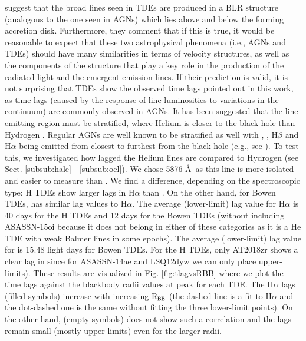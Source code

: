 \documentclass[structabstract]{aa}
\begin{document}
\citet{Guillochon2014} suggest that the broad lines seen in TDEs are produced in a BLR structure (analogous to the one seen in AGNs) which lies above and below the forming accretion disk. Furthermore, they comment that if this is true, it would be reasonable to expect that these two astrophysical phenomena (i.e., AGNs and TDEs) should have many similarities in terms of velocity structures, as well as the components of the structure that play a key role in the production of the radiated light and the emergent emission lines. If their prediction is valid, it is not surprising that TDEs show the observed time lags pointed out in this work, as time lags (caused by the response of line luminosities to variations in the continuum) are commonly observed in AGNs. 
It has been  suggested that the line emitting region must be stratified, where Helium is closer to the black hole than Hydrogen \citep{Guillochon2014,Roth2016}. Regular AGNs are well known to be stratified as well with , , H$\beta$ and H$\alpha$ being emitted from closest to furthest from the black hole (e.g., see \citealt{Clavel1991,Peterson1999}). 
To test this, we investigated how lagged the Helium lines are compared to Hydrogen (see Sect. \ref{subsub:hale} - \ref{subsub:oel}).
We chose  5876 \AA\, 
as this line is more isolated and easier to measure than . We find a difference, depending on the spectroscopic type: H TDEs show larger lags in H$\alpha$ than . On the other hand, for  Bowen TDEs,   has similar lag values to H$\alpha$. 
The average (lower-limit) lag value for H$\alpha$ is 40 days for the H TDEs and 12 days for the  Bowen TDEs (without including ASASSN-15oi because it does not belong in either of these categories as it is a He TDE with weak Balmer lines in some epochs). The average (lower-limit) lag value for  is 15.48 light days for  Bowen TDEs.
For the H TDEs, only AT2018zr shows a clear lag in   since for ASASSN-14ae and LSQ12dyw we can only place upper-limits). 
These results are visualized in Fig. \ref{fig:tlagvsRBB} where we plot the time lags against the blackbody radii values at peak for each TDE. 
The H$\alpha$ lags (filled symbols) increase with increasing R$_{\rm BB}$ (the dashed line is a fit to H$\alpha$ and the dot-dashed one is the same without fitting the  three lower-limit points).
On the other hand,  (empty symbols) does not show such a correlation and the lags remain small (mostly upper-limits) even for the larger radii.
\end{document}
